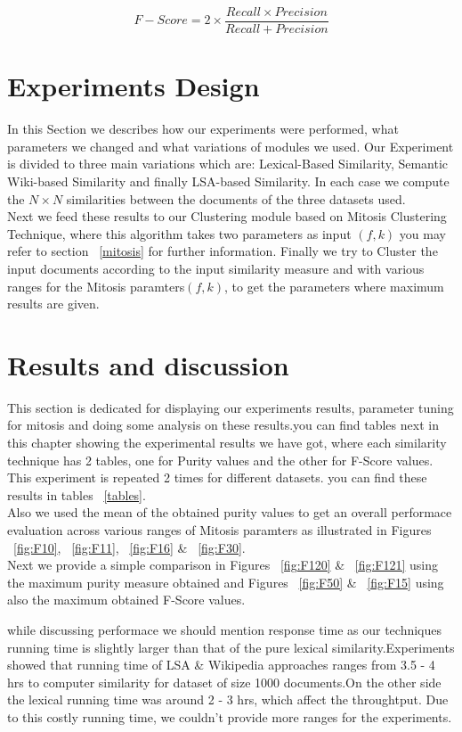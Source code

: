 \begin{equation}
\label{fmeasure}
F-Score = 2\times \frac {Recall\times Precision}{Recall + Precision}
\end{equation}

\section{Experiments Design}\label{sec:test}
In this Section we describes how our experiments were performed, what parameters we changed and what variations of modules we used.
Our Experiment is divided to three main variations which are: Lexical-Based Similarity, Semantic Wiki-based Similarity and finally LSA-based Similarity. In each case we compute the $N\times N$ similarities between the documents of the three datasets used.\\
Next we feed these results to our Clustering module based on Mitosis Clustering Technique, where this algorithm takes two parameters as input $(f,k)$ you may refer to section ~\ref{mitosis} for further information.
Finally we try to Cluster the input documents according to the input similarity measure and with various ranges for the Mitosis paramters$(f,k)$, to get the parameters where maximum results are given.

\section{Results and discussion}\label{sec:results}
This section is dedicated for displaying our experiments results, parameter tuning for mitosis and doing some analysis on these results.you can find tables next in this chapter showing the experimental results we have got, where each similarity technique has 2 tables, one for Purity values and the other for F-Score values. This experiment is repeated 2 times for different datasets. you can find these results in tables ~\ref{tables}.\\

Also we used the mean of the obtained purity values to get an overall performace evaluation across various ranges of Mitosis paramters as illustrated in Figures ~\ref{fig:F10}, ~\ref{fig:F11}, ~\ref{fig:F16} \& ~\ref{fig:F30}.\\
Next we provide a simple comparison in Figures ~\ref{fig:F120} \& ~\ref{fig:F121} using the maximum purity measure obtained and Figures  ~\ref{fig:F50} \& ~\ref{fig:F15} using also the maximum obtained F-Score values.

while discussing performace we should mention response time as our techniques running time is slightly larger than that of the pure lexical similarity.Experiments showed that running time of LSA \& Wikipedia approaches ranges from 3.5 - 4 hrs to computer similarity for dataset of size 1000 documents.On the other side the lexical running time was around 2 - 3 hrs, which affect the throughtput. Due to  this costly running time, we couldn't provide more ranges for the experiments.\\

